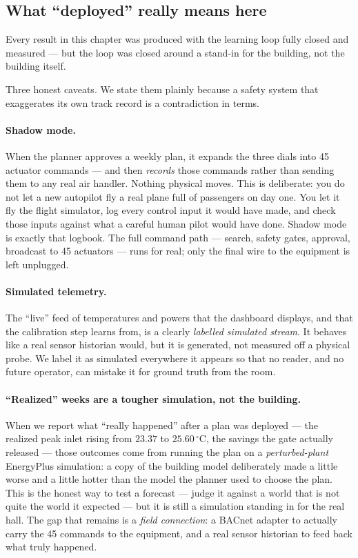 \subsection{What ``deployed'' really means here}

\begin{keyidea}
Every result in this chapter was produced with the learning loop fully closed and measured --- but the loop was closed around a stand-in for the building, not the building itself.
\end{keyidea}

Three honest caveats. We state them plainly because a safety system that exaggerates its own track record is a contradiction in terms.

\paragraph{Shadow mode.} When the planner approves a weekly plan, it expands the three dials into 45 actuator commands --- and then \emph{records} those commands rather than sending them to any real air handler. Nothing physical moves. This is deliberate: you do not let a new autopilot fly a real plane full of passengers on day one. You let it fly the flight simulator, log every control input it would have made, and check those inputs against what a careful human pilot would have done. Shadow mode is exactly that logbook. The full command path --- search, safety gates, approval, broadcast to 45 actuators --- runs for real; only the final wire to the equipment is left unplugged.

\paragraph{Simulated telemetry.} The ``live'' feed of temperatures and powers that the dashboard displays, and that the calibration step learns from, is a clearly \emph{labelled simulated stream}. It behaves like a real sensor historian would, but it is generated, not measured off a physical probe. We label it as simulated everywhere it appears so that no reader, and no future operator, can mistake it for ground truth from the room.

\paragraph{``Realized'' weeks are a tougher simulation, not the building.} When we report what ``really happened'' after a plan was deployed --- the realized peak inlet rising from $23.37$ to $25.60\,^\circ$C, the savings the gate actually released --- those outcomes come from running the plan on a \emph{perturbed-plant} EnergyPlus simulation: a copy of the building model deliberately made a little worse and a little hotter than the model the planner used to choose the plan. This is the honest way to test a forecast --- judge it against a world that is not quite the world it expected --- but it is still a simulation standing in for the real hall. The gap that remains is a \emph{field connection}: a BACnet adapter to actually carry the 45 commands to the equipment, and a real sensor historian to feed back what truly happened.

